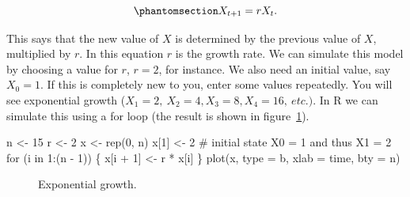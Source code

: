 \documentclass[
  a4paper,
  DIV=11,
  numbers=noendperiod,
  oneside]{scrreprt}
\newenvironment{Shaded}{}{}
\newcommand{\AttributeTok}[1]{\textcolor[rgb]{0.84,0.23,0.29}{#1}}
\newcommand{\CommentTok}[1]{\textcolor[rgb]{0.42,0.45,0.49}{#1}}
\newcommand{\ControlFlowTok}[1]{\textcolor[rgb]{0.84,0.23,0.29}{#1}}
\newcommand{\DecValTok}[1]{\textcolor[rgb]{0.00,0.36,0.77}{#1}}
\newcommand{\FunctionTok}[1]{\textcolor[rgb]{0.44,0.26,0.76}{#1}}
\newcommand{\NormalTok}[1]{\textcolor[rgb]{0.14,0.16,0.18}{#1}}
\newcommand{\OtherTok}[1]{\textcolor[rgb]{0.44,0.26,0.76}{#1}}
\newcommand{\SpecialCharTok}[1]{\textcolor[rgb]{0.00,0.36,0.77}{#1}}
\newcommand{\StringTok}[1]{\textcolor[rgb]{0.01,0.18,0.38}{#1}}
\begin{document}
\begin{equation}\phantomsection\label{eq-ch2-1}{
X_{t + 1} = rX_{t}.}\end{equation}

This says that the new value of \(X\) is determined by the previous
value of \(X\), multiplied by \(r\). In this equation \(r\) is the
growth rate. We can simulate this model by choosing a value for \(r\),
\(r=2\), for instance. We also need an initial value, say \(X_{0} = 1.\)
If this is completely new to you, enter some values repeatedly. You will
see exponential growth
(\(X_{1} = 2,\ X_{2} = 4,X_{3} = 8,X_{4} = 16,\ etc.)\). In R we can
simulate this using a for loop (the result is shown in
figure~\ref{fig-ch2-img1}).

\begin{Shaded}
\begin{Highlighting}[]
\NormalTok{n }\OtherTok{\textless{}{-}} \DecValTok{15}
\NormalTok{r }\OtherTok{\textless{}{-}} \DecValTok{2}
\NormalTok{x }\OtherTok{\textless{}{-}} \FunctionTok{rep}\NormalTok{(}\DecValTok{0}\NormalTok{, n)}
\NormalTok{x[}\DecValTok{1}\NormalTok{] }\OtherTok{\textless{}{-}} \DecValTok{2} \CommentTok{\# initial state X0 = 1 and thus X1 = 2}
\ControlFlowTok{for}\NormalTok{ (i }\ControlFlowTok{in} \DecValTok{1}\SpecialCharTok{:}\NormalTok{(n }\SpecialCharTok{{-}} \DecValTok{1}\NormalTok{)) \{}
\NormalTok{  x[i }\SpecialCharTok{+} \DecValTok{1}\NormalTok{] }\OtherTok{\textless{}{-}}\NormalTok{ r }\SpecialCharTok{*}\NormalTok{ x[i]}
\NormalTok{\}}
\FunctionTok{plot}\NormalTok{(x, }\AttributeTok{type =} \StringTok{\textquotesingle{}b\textquotesingle{}}\NormalTok{, }\AttributeTok{xlab =} \StringTok{\textquotesingle{}time\textquotesingle{}}\NormalTok{, }\AttributeTok{bty =} \StringTok{\textquotesingle{}n\textquotesingle{}}\NormalTok{)}
\end{Highlighting}
\end{Shaded}

\begin{figure}


\caption{\label{fig-ch2-img1}Exponential growth.}

\end{figure}%
\end{document}
